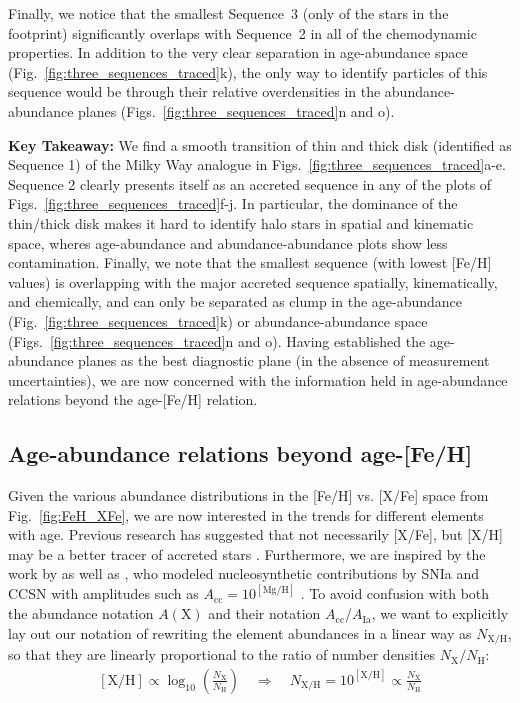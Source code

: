 \documentclass[fleqn,usenatbib]{mnras}
\begin{document}
Finally, we notice that the smallest Sequence~3 (only  of the stars in the footprint) significantly overlaps with Sequence~2 in all of the chemodynamic properties. In addition to the very clear separation in age-abundance space (Fig.~\ref{fig:three_sequences_traced}k), the only way to identify particles of this sequence would be through their relative overdensities in the abundance-abundance planes (Figs.~\ref{fig:three_sequences_traced}n and o).

\textbf{Key Takeaway:} We find a smooth transition of thin and thick disk (identified as Sequence 1) of the Milky Way analogue in Figs.~\ref{fig:three_sequences_traced}a-e. Sequence 2 clearly presents itself as an accreted sequence in any of the plots of Figs.~\ref{fig:three_sequences_traced}f-j. In particular, the dominance of the thin/thick disk makes it hard to identify halo stars in spatial and kinematic space, wheres age-abundance and abundance-abundance plots show less contamination. Finally, we note that the smallest sequence (with lowest [Fe/H] values) is overlapping with the major accreted sequence spatially, kinematically, and chemically, and can only be separated as clump in the age-abundance (Fig.~\ref{fig:three_sequences_traced}k) or abundance-abundance space (Figs.~\ref{fig:three_sequences_traced}n and o). Having established the age-abundance planes as the best diagnostic plane (in the absence of measurement uncertainties), we are now concerned with the information held in age-abundance relations beyond the age-[Fe/H] relation.

\subsection{Age-abundance relations beyond age-[Fe/H]} \label{sec:age-abundance-sequences}

Given the various abundance distributions in the [Fe/H] vs. [X/Fe] space from Fig.~\ref{fig:FeH_XFe}, we are now interested in the trends for different elements with age. Previous research has suggested that not necessarily [X/Fe], but [X/H] may be a better tracer of accreted stars \citep[e.g.][for {[Mg/H]}]{Fuhrmann2017, Feuillet2021}. Furthermore, we are inspired by the work by \citet{Weinberg2019, Weinberg2021} as well as \cite{Griffith2019, Griffith2022}, who modeled nucleosynthetic contributions by SNIa and CCSN with amplitudes such as $A_\text{cc} = 10^\mathrm{[Mg/H]}$ \citep{Weinberg2019}. To avoid confusion with both the abundance notation $A(\mathrm{X})$ and their notation $A_\mathrm{cc}$/$A_\mathrm{Ia}$, we want to explicitly lay out our notation of rewriting the element abundances in a linear way as $N_\mathrm{X/H}$, so that they are linearly proportional to the ratio of number densities $N_\mathrm{X}/N_\mathrm{H}$:
\begin{align}
    \left[\text{X/H}\right] \varpropto \log_{10}\left(\frac{N_\mathrm{X}}{N_\mathrm{H}}\right) \quad \Rightarrow \quad N_\mathrm{X/H} = 10^{\mathrm{[X/H]}} \varpropto \frac{N_\mathrm{X}}{N_\mathrm{H}}
\end{align}
\end{document}
